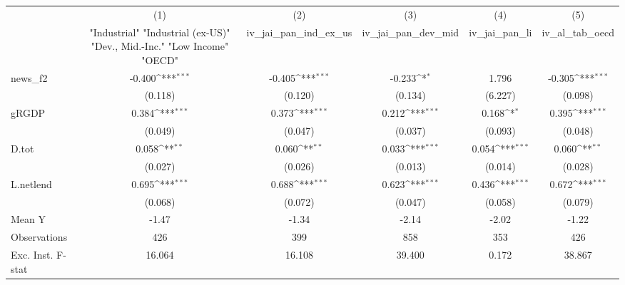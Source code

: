 {
\def\sym#1{\ifmmode^{#1}\else\(^{#1}\)\fi}
\begin{tabular}{l*{5}{c}}
\toprule
            &\multicolumn{1}{c}{(1)}&\multicolumn{1}{c}{(2)}&\multicolumn{1}{c}{(3)}&\multicolumn{1}{c}{(4)}&\multicolumn{1}{c}{(5)}\\
            &\multicolumn{1}{c}{ "Industrial" "Industrial (ex-US)" "Dev., Mid.-Inc." "Low Income" "OECD" }&\multicolumn{1}{c}{iv\_jai\_pan\_ind\_ex\_us}&\multicolumn{1}{c}{iv\_jai\_pan\_dev\_mid}&\multicolumn{1}{c}{iv\_jai\_pan\_li}&\multicolumn{1}{c}{iv\_al\_tab\_oecd}\\
\midrule
news\_f2     &      -0.400\sym{***}&      -0.405\sym{***}&      -0.233\sym{*}  &       1.796         &      -0.305\sym{***}\\
            &     (0.118)         &     (0.120)         &     (0.134)         &     (6.227)         &     (0.098)         \\
\addlinespace
gRGDP       &       0.384\sym{***}&       0.373\sym{***}&       0.212\sym{***}&       0.168\sym{*}  &       0.395\sym{***}\\
            &     (0.049)         &     (0.047)         &     (0.037)         &     (0.093)         &     (0.048)         \\
\addlinespace
D.tot       &       0.058\sym{**} &       0.060\sym{**} &       0.033\sym{***}&       0.054\sym{***}&       0.060\sym{**} \\
            &     (0.027)         &     (0.026)         &     (0.013)         &     (0.014)         &     (0.028)         \\
\addlinespace
L.netlend   &       0.695\sym{***}&       0.688\sym{***}&       0.623\sym{***}&       0.436\sym{***}&       0.672\sym{***}\\
            &     (0.068)         &     (0.072)         &     (0.047)         &     (0.058)         &     (0.079)         \\
\midrule
Mean Y      &       -1.47         &       -1.34         &       -2.14         &       -2.02         &       -1.22         \\
Observations&         426         &         399         &         858         &         353         &         426         \\
Exc. Inst. F-stat&      16.064         &      16.108         &      39.400         &       0.172         &      38.867         \\
\bottomrule
\end{tabular}
}
